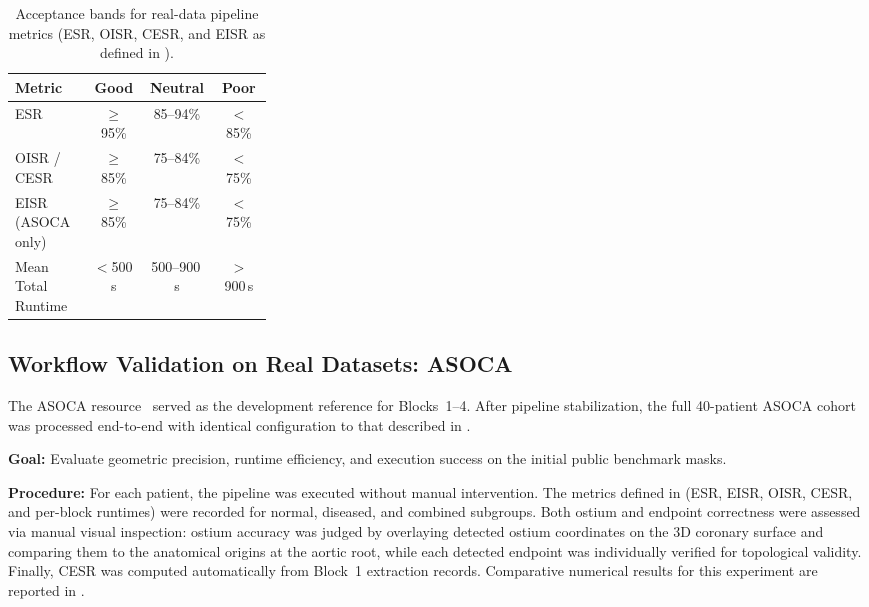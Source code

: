 \begin{table}[H]
  \caption{Acceptance bands for real-data pipeline metrics (ESR, OISR, CESR, and EISR as defined in ).}
  \label{tab:validation-real-thresholds}
  \vspace{0.5em}
  \centering
  \small
  \renewcommand{\arraystretch}{1.35}
  \setlength{\tabcolsep}{6pt}
  \begin{tabular}{@{}>{\raggedright\arraybackslash}p{0.30\linewidth}ccc@{}}
    \toprule
    \cellcolor{gray!12}\textbf{Metric} &
    \cellcolor{gray!12}\textbf{Good} &
    \cellcolor{gray!12}\textbf{Neutral} &
    \cellcolor{gray!12}\textbf{Poor} \\
    \midrule
    ESR & $\geq$95\% & 85--94\% & $<$85\% \\
    OISR / CESR & $\geq$85\% & 75--84\% & $<$75\% \\
    EISR (ASOCA only) & $\geq$85\% & 75--84\% & $<$75\% \\
    Mean Total Runtime & $<$500\,s & 500--900\,s & $>$900\,s \\
    \bottomrule
  \end{tabular}
\end{table}

\subsection{Workflow Validation on Real Datasets: ASOCA}
\label{subsec:validation-asoca}

The ASOCA resource~\cite{gharleghi2022asoca} served as the development reference for Blocks~1--4. After pipeline stabilization, the full 40-patient ASOCA cohort was processed end-to-end with identical configuration to that described in .

\textbf{Goal:} Evaluate geometric precision, runtime efficiency, and execution success on the initial public benchmark masks.

\textbf{Procedure:} For each patient, the pipeline was executed without manual intervention. The metrics defined in  (ESR, EISR, OISR, CESR, and per-block runtimes) were recorded for normal, diseased, and combined subgroups. Both ostium and endpoint correctness were assessed via manual visual inspection: ostium accuracy was judged by overlaying detected ostium coordinates on the 3D coronary surface and comparing them to the anatomical origins at the aortic root, while each detected endpoint was individually verified for topological validity. Finally, CESR was computed automatically from Block~1 extraction records. Comparative numerical results for this experiment are reported in .

